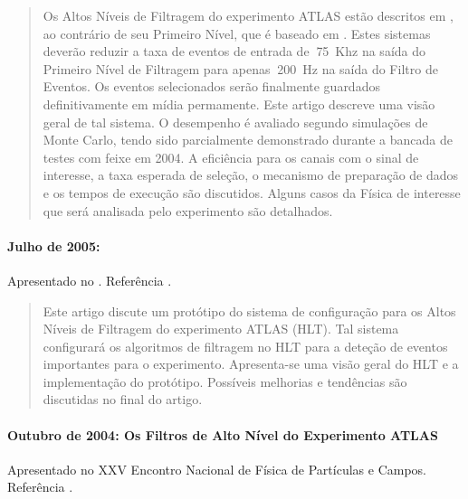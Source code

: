 \begin{quotation}
Os Altos Níveis de Filtragem do experimento ATLAS estão descritos em
, ao contrário de seu Primeiro Nível, que é baseado em
. Estes sistemas deverão reduzir a taxa de eventos de entrada de
$~$75~Khz na saída do Primeiro Nível de Filtragem para apenas $~$200~Hz na
saída do Filtro de Eventos. Os eventos selecionados serão finalmente guardados
definitivamente em mídia permamente. Este artigo descreve uma visão geral de
tal sistema. O desempenho é avaliado segundo simulações de Monte Carlo, tendo
sido parcialmente demonstrado durante a bancada de testes com feixe em 2004. A
eficiência para os canais com o sinal de interesse, a taxa esperada de
seleção, o mecanismo de preparação de dados e os tempos de execução são
discutidos. Alguns casos da Física de interesse que será analisada pelo
experimento são detalhados.
\end{quotation}

\paragraph{Julho de 2005: }
Apresentado no . Referência \cite{aa:rt-05}.

\begin{quotation}
Este artigo discute um protótipo do sistema de configuração para os Altos
Níveis de Filtragem do experimento ATLAS (HLT). Tal sistema configurará os
algoritmos de filtragem no HLT para a deteção de eventos importantes para o
experimento. Apresenta-se uma visão geral do HLT e a implementação do
protótipo. Possíveis melhorias e tendências são discutidas no final do artigo.
\end{quotation}

\paragraph{Outubro de 2004: Os Filtros de Alto Nível do Experimento ATLAS}
Apresentado no XXV Encontro Nacional de Física de Partículas e
Campos. Referência \cite{aa:enfpc-04}.

